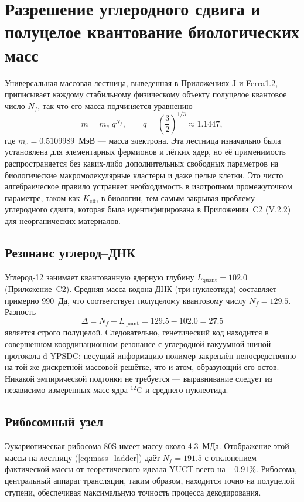 \documentclass[12pt,a4paper]{article}
\begin{document}
	\section{Разрешение углеродного сдвига и полуцелое квантование биологических масс}
	\label{sec:quantization}
	
	Универсальная массовая лестница, выведенная в Приложениях J и Ferra1.2, приписывает каждому стабильному физическому объекту полуцелое квантовое число \(N_f\), так что его масса подчиняется уравнению
	\begin{equation}
		m = m_e \; q^{N_f}, \qquad q = \left(\frac{3}{2}\right)^{1/3} \approx 1.1447,
		\label{eq:mass_ladder}
	\end{equation}
	где \(m_e = 0.5109989\)~МэВ — масса электрона. Эта лестница изначально была установлена для элементарных фермионов и лёгких ядер, но её применимость распространяется без каких-либо дополнительных свободных параметров на биологические макромолекулярные кластеры и даже целые клетки. Это чисто алгебраическое правило устраняет необходимость в изотропном промежуточном параметре, таком как \(K_{\mathrm{eff}}\), в биологии, тем самым закрывая проблему углеродного сдвига, которая была идентифицирована в Приложении~C2 (V.2.2) для неорганических материалов.
	
	\subsection{Резонанс углерод–ДНК}
	Углерод‑12 занимает квантованную ядерную глубину \(L_{\mathrm{quant}} = 102.0\) (Приложение~C2). Средняя масса кодона ДНК (три нуклеотида) составляет примерно 990~Да, что соответствует полуцелому квантовому числу \(N_f = 129.5\). Разность
	\[
	\Delta = N_f - L_{\mathrm{quant}} = 129.5 - 102.0 = 27.5
	\]
	является строго полуцелой. Следовательно, генетический код находится в совершенном координационном резонансе с углеродной вакуумной шиной протокола d‑YPSDC: несущий информацию полимер закреплён непосредственно на той же дискретной массовой решётке, что и атом, образующий его остов. Никакой эмпирической подгонки не требуется — выравнивание следует из независимо измеренных масс ядра \(^{12}\mathrm{C}\) и среднего нуклеотида.
	
	\subsection{Рибосомный узел}
	Эукариотическая рибосома 80S имеет массу около 4.3~МДа. Отображение этой массы на лестницу (\ref{eq:mass_ladder}) даёт \(N_f = 191.5\) с отклонением фактической массы от теоретического идеала YUCT всего на \(-0.91\%\). Рибосома, центральный аппарат трансляции, таким образом, находится точно на полуцелой ступени, обеспечивая максимальную точность процесса декодирования.
	
\end{document}
